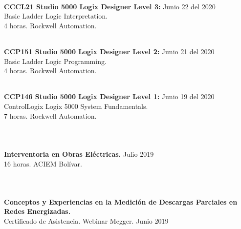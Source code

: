 \documentclass[margin]{res}
\begin{document}
\begin{resume}
\\\textbf{CCCL21 Studio 5000 Logix Designer Level 3:} \hfill Junio 22 del 2020
\\Basic Ladder Logic Interpretation.
\\ 4 horas. Rockwell Automation.

\\\textbf{CCP151 Studio 5000 Logix Designer Level 2:} \hfill Junio 21 del 2020
\\Basic Ladder Logic Programming.
\\ 4 horas. Rockwell Automation.

\\\textbf{CCP146 Studio 5000 Logix Designer Level 1:} \hfill Junio 19 del 2020
\\ControlLogix Logix 5000 System Fundamentals.
\\ 7 horas. Rockwell Automation. 

\section{\centering}
\hfill
\\\textbf{Interventoria en Obras Eléctricas.} \hfill Julio 2019
\\ 16 horas. ACIEM Bolívar. 

\section{\centering}
\hfill
\\\textbf{Conceptos y Experiencias en la Medición de Descargas Parciales en Redes Energizadas.} 
\\ Certificado de Asistencia. Webinar Megger. \hfill Junio 2019


\end{resume}
\end{document}
